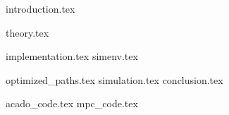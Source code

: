 \documentclass[]{report}
\numberwithin{equation}{chapter}
\begin{document}

\setcounter{page}{1}


\tableofcontents
{}
\newpage

\listoffigures									
{}
\clearpage

\setcounter{page}{1}
\pagestyle{fancy}

{introduction.tex}

{theory.tex}

{implementation.tex}
{simenv.tex}

{optimized_paths.tex}
{simulation.tex}
{conclusion.tex}

\begin{appendices}
{acado_code.tex}
{mpc_code.tex}
\end{appendices}


\newpage


{}
\end{document}

